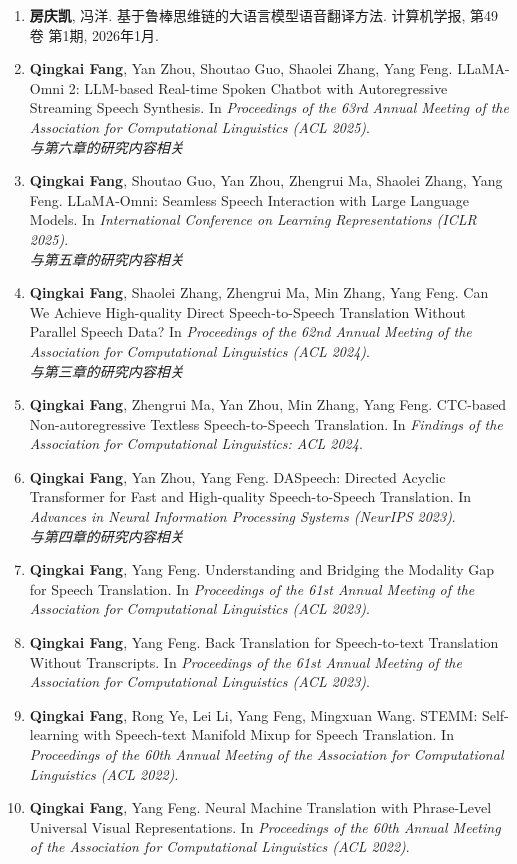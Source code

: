 {
\setlist[enumerate]{}%
\begin{enumerate}[nosep]
    \item \textbf{房庆凯}, 冯洋. 基于鲁棒思维链的大语言模型语音翻译方法. 计算机学报, 第49卷 第1期, 2026年1月.
    \item \textbf{Qingkai Fang}, Yan Zhou, Shoutao Guo, Shaolei Zhang, Yang Feng. LLaMA-Omni 2: LLM-based Real-time Spoken Chatbot with Autoregressive Streaming Speech Synthesis. In \textit{Proceedings of the 63rd Annual Meeting of the Association for Computational Linguistics (ACL 2025)}.\\ \textit{与第六章的研究内容相关}
    \item \textbf{Qingkai Fang}, Shoutao Guo, Yan Zhou, Zhengrui Ma, Shaolei Zhang, Yang Feng. LLaMA-Omni: Seamless Speech Interaction with Large Language Models. In \textit{International Conference on Learning Representations (ICLR 2025)}.\\ \textit{与第五章的研究内容相关}
    \item \textbf{Qingkai Fang}, Shaolei Zhang, Zhengrui Ma, Min Zhang, Yang Feng. Can We Achieve High-quality Direct Speech-to-Speech Translation Without Parallel Speech Data? In \textit{Proceedings of the 62nd Annual Meeting of the Association for Computational Linguistics (ACL 2024)}.\\ \textit{与第三章的研究内容相关}
    \item \textbf{Qingkai Fang}, Zhengrui Ma, Yan Zhou, Min Zhang, Yang Feng. CTC-based Non-autoregressive Textless Speech-to-Speech Translation. In \textit{Findings of the Association for Computational Linguistics: ACL 2024}.
    \item \textbf{Qingkai Fang}, Yan Zhou, Yang Feng. DASpeech: Directed Acyclic Transformer for Fast and High-quality Speech-to-Speech Translation. In \textit{Advances in Neural Information Processing Systems (NeurIPS 2023)}.\\ \textit{与第四章的研究内容相关}
    \item \textbf{Qingkai Fang}, Yang Feng. Understanding and Bridging the Modality Gap for Speech Translation. In \textit{Proceedings of the 61st Annual Meeting of the Association for Computational Linguistics (ACL 2023)}.
    \item \textbf{Qingkai Fang}, Yang Feng. Back Translation for Speech-to-text Translation Without Transcripts. In \textit{Proceedings of the 61st Annual Meeting of the Association for Computational Linguistics (ACL 2023)}.
    \item \textbf{Qingkai Fang}, Rong Ye, Lei Li, Yang Feng, Mingxuan Wang. STEMM: Self-learning with Speech-text Manifold Mixup for Speech Translation. In \textit{Proceedings of the 60th Annual Meeting of the Association for Computational Linguistics (ACL 2022)}.
    \item \textbf{Qingkai Fang}, Yang Feng. Neural Machine Translation with Phrase-Level Universal Visual Representations. In \textit{Proceedings of the 60th Annual Meeting of the Association for Computational Linguistics (ACL 2022)}.
\end{enumerate}
}

